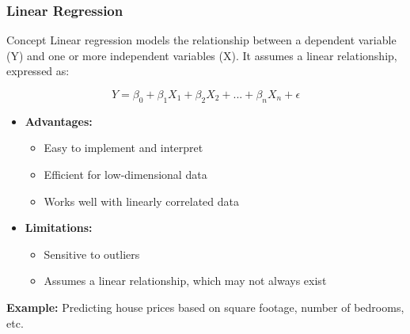 \documentclass[aspectratio=169]{beamer}
\begin{document}
\begin{frame}[fragile]
    \frametitle{Linear Regression}
    \begin{block}{Concept}
        Linear regression models the relationship between a dependent variable (Y) and one or more independent variables (X). 
        It assumes a linear relationship, expressed as:
    \end{block}
    
    \begin{equation}
        Y = \beta_0 + \beta_1X_1 + \beta_2X_2 + ... + \beta_nX_n + \epsilon
    \end{equation}
    
    \begin{itemize}
        \item \textbf{Advantages:}
        \begin{itemize}
            \item Easy to implement and interpret
            \item Efficient for low-dimensional data
            \item Works well with linearly correlated data
        \end{itemize}
        
        \item \textbf{Limitations:}
        \begin{itemize}
            \item Sensitive to outliers
            \item Assumes a linear relationship, which may not always exist
        \end{itemize}
    \end{itemize}
    
    \textbf{Example:} Predicting house prices based on square footage, number of bedrooms, etc.
\end{frame}
\end{document}
